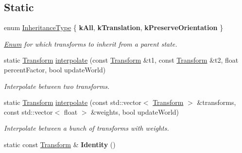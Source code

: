 \subsection*{Static}
\begin{DoxyCompactItemize}
\item 
\mbox{\label{classrev_1_1_transform_a0945b935b8f5fbf95920720ac8874e93}} 
enum \mbox{\hyperlink{classrev_1_1_transform_a0945b935b8f5fbf95920720ac8874e93}{Inheritance\+Type}} \{ {\bfseries k\+All}, 
{\bfseries k\+Translation}, 
{\bfseries k\+Preserve\+Orientation}
 \}
\begin{DoxyCompactList}\small\item\em \mbox{\hyperlink{struct_enum}{Enum}} for which transforms to inherit from a parent state. \end{DoxyCompactList}\item 
\mbox{\label{classrev_1_1_transform_a62b3c04f805cfdeed329ca3e1ac8c769}} 
static \mbox{\hyperlink{classrev_1_1_transform}{Transform}} \mbox{\hyperlink{classrev_1_1_transform_a62b3c04f805cfdeed329ca3e1ac8c769}{interpolate}} (const \mbox{\hyperlink{classrev_1_1_transform}{Transform}} \&t1, const \mbox{\hyperlink{classrev_1_1_transform}{Transform}} \&t2, float percent\+Factor, bool update\+World)
\begin{DoxyCompactList}\small\item\em Interpolate between two transforms. \end{DoxyCompactList}\item 
\mbox{\label{classrev_1_1_transform_a870e146573e4327e664ca9bcc30e2716}} 
static \mbox{\hyperlink{classrev_1_1_transform}{Transform}} \mbox{\hyperlink{classrev_1_1_transform_a870e146573e4327e664ca9bcc30e2716}{interpolate}} (const std\+::vector$<$ \mbox{\hyperlink{classrev_1_1_transform}{Transform}} $>$ \&transforms, const std\+::vector$<$ float $>$ \&weights, bool update\+World)
\begin{DoxyCompactList}\small\item\em Interpolate between a bunch of transforms with weights. \end{DoxyCompactList}\item 
\mbox{\label{classrev_1_1_transform_aecadfa9d2bd2065f82928ec6a90ecbe5}} 
static const \mbox{\hyperlink{classrev_1_1_transform}{Transform}} \& {\bfseries Identity} ()
\end{DoxyCompactItemize}
